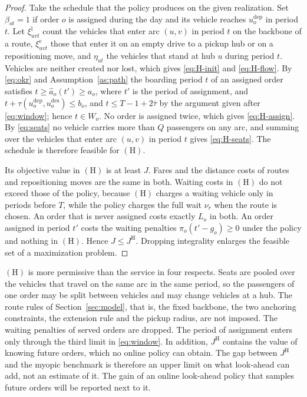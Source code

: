 \documentclass[12pt]{article}
\theoremstyle{plain}
\theoremstyle{definition}
\newcommand{\dep}{u^{\mathrm{dep}}}
\newcommand{\des}{u^{\mathrm{des}}}
\begin{document}
\begin{proof}
Take the schedule that the policy produces on the given realization. Set $\beta_{ot}=1$ if order $o$ is assigned during the day and its vehicle reaches $\dep_o$ in period $t$. Let $\xi^{\mathrm{l}}_{uvt}$ count the vehicles that enter arc $(u,v)$ in period $t$ on the backbone of a route, $\xi^{\mathrm{e}}_{uvt}$ those that enter it on an empty drive to a pickup hub or on a repositioning move, and $\eta_{ut}$ the vehicles that stand at hub $u$ during period $t$. Vehicles are neither created nor lost, which gives \eqref{eq:H-init} and \eqref{eq:H-flow}. By \eqref{eq:okr} and Assumption~\ref{as:path} the boarding period $t$ of an assigned order satisfies $t\ge\hat a_o(t')\ge a_o$, where $t'$ is the period of assignment, and $t+\tau(\dep_o,\des_o)\le b_o$, and $t\le T-1+2\bar\tau$ by the argument given after \eqref{eq:window}; hence $t\in W_o$. No order is assigned twice, which gives \eqref{eq:H-assign}. By \eqref{eq:seats} no vehicle carries more than $Q$ passengers on any arc, and summing over the vehicles that enter arc $(u,v)$ in period $t$ gives \eqref{eq:H-seats}. The schedule is therefore feasible for $(\mathrm{H})$.

Its objective value in $(\mathrm{H})$ is at least $J$. Fares and the distance costs of routes and repositioning moves are the same in both. Waiting costs in $(\mathrm{H})$ do not exceed those of the policy, because $(\mathrm{H})$ charges a waiting vehicle only in periods before $T$, while the policy charges the full wait $\nu_r$ when the route is chosen. An order that is never assigned costs exactly $L_o$ in both. An order assigned in period $t'$ costs the waiting penalties $\pi_o(t'-g_o)\ge 0$ under the policy and nothing in $(\mathrm{H})$. Hence $J\le J^{\mathrm{H}}$. Dropping integrality enlarges the feasible set of a maximization problem.
\end{proof}

$(\mathrm{H})$ is more permissive than the service in four respects. Seats are pooled over the vehicles that travel on the same arc in the same period, so the passengers of one order may be split between vehicles and may change vehicles at a hub. The route rules of Section~\ref{sec:model}, that is, the fixed backbone, the two anchoring constraints, the extension rule and the pickup radius, are not imposed. The waiting penalties of served orders are dropped. The period of assignment enters only through the third limit in \eqref{eq:window}. In addition, $J^{\mathrm{H}}$ contains the value of knowing future orders, which no online policy can obtain. The gap between $J^{\mathrm{H}}$ and the myopic benchmark is therefore an upper limit on what look-ahead can add, not an estimate of it. The gain of an online look-ahead policy that samples future orders will be reported next to it.
\end{document}
